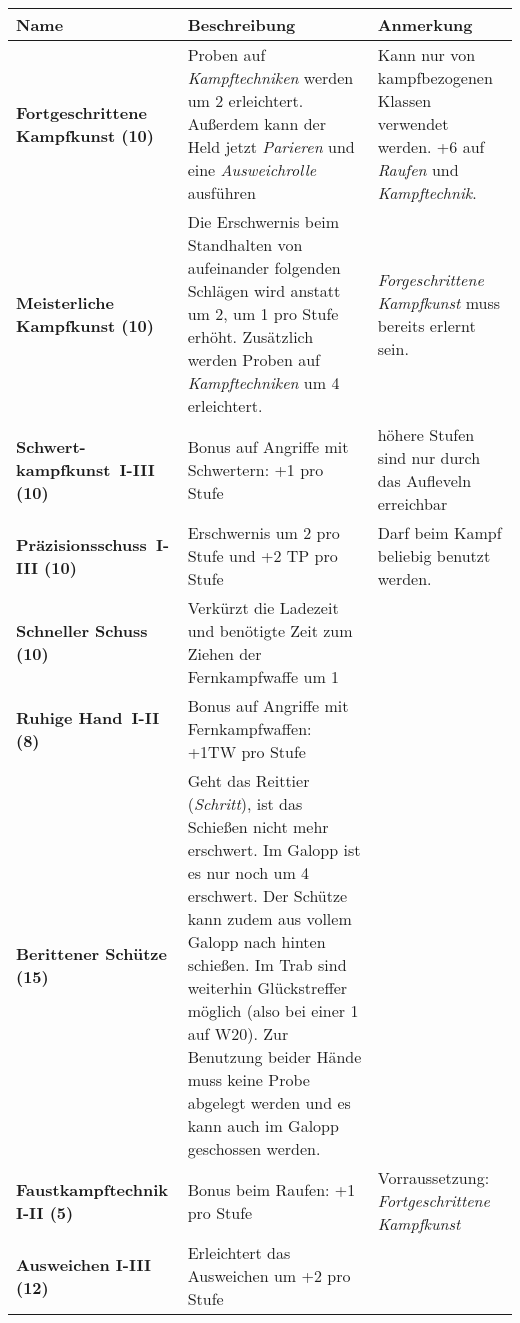 \begin{longtable}{| p{4cm} | p{8cm} | p{3cm} |}
\hline
\textbf{Name} & \textbf{Beschreibung} & \textbf{Anmerkung} \\

\hline
\textbf{Fortgeschrittene Kampfkunst (10)} & Proben auf \textit{Kampftechniken} werden um 2 erleichtert. Außerdem kann der Held jetzt \textit{Parieren} und eine \textit{Ausweichrolle} ausführen & Kann nur von kampfbezogenen Klassen verwendet werden. +6 auf \textit{Raufen} und \textit{Kampftechnik}. \\

\hline 
\textbf{Meisterliche Kampfkunst (10)} & Die Erschwernis beim Standhalten von aufeinander folgenden Schlägen wird anstatt um 2, um 1 pro Stufe erhöht. Zusätzlich werden Proben auf \textit{Kampftechniken} um 4 erleichtert. & \textit{Forgeschrittene Kampfkunst} muss bereits erlernt sein. \\

\hline
\textbf{Schwert-kampfkunst~I-III (10)} & Bonus auf Angriffe mit Schwertern: +1 pro Stufe & höhere Stufen sind nur durch das Aufleveln erreichbar \\

\hline
\textbf{Präzisionsschuss~I-III (10)} & Erschwernis um 2 pro Stufe und +2 TP pro Stufe & Darf beim Kampf beliebig benutzt werden. \\

\hline
\textbf{Schneller Schuss (10)} & Verkürzt die Ladezeit und benötigte Zeit zum Ziehen der Fernkampfwaffe um 1 & \\

\hline
\textbf{Ruhige Hand~I-II (8)} & Bonus auf Angriffe mit Fernkampfwaffen: +1TW pro Stufe & \\

\hline
\textbf{Berittener Schütze (15)} & Geht das Reittier (\textit{Schritt}), ist das Schießen nicht mehr erschwert. Im Galopp ist es nur noch um 4 erschwert. Der Schütze kann zudem aus vollem Galopp nach hinten schießen. Im Trab sind weiterhin Glückstreffer möglich (also bei einer 1 auf W20). Zur Benutzung beider Hände muss keine Probe abgelegt werden und es kann auch im Galopp geschossen werden. & \\

\hline
\textbf{Faustkampftechnik I-II (5)} & Bonus beim Raufen: +1 pro Stufe & Vorraussetzung: \textit{Fortgeschrittene Kampfkunst} \\

\hline
\textbf{Ausweichen I-III (12)} & Erleichtert das Ausweichen um +2 pro Stufe & \\


\end{longtable}
